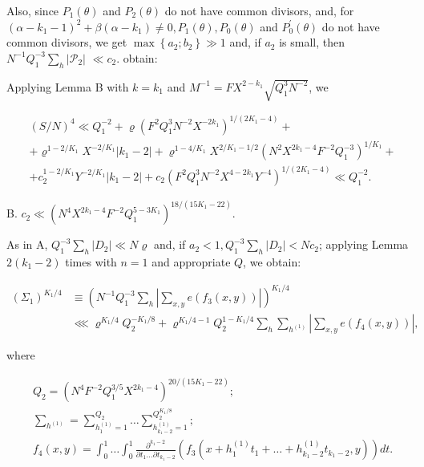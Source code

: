 \documentclass[10pt]{article}
\begin{document}
Also, since $P_{1}(\theta)$ and $P_{2}(\theta)$ do not have common divisors, and, for $\left(\alpha-k_{1}-1\right)^{2}+\beta\left(\alpha-k_{1}\right) \neq 0, P_{1}(\theta), P_{0}(\theta)$ and $P_{0}^{\prime}(\theta)$ do not have common divisors, we get $\max \left\{a_{2} ; b_{2}\right\} \gg 1$ and, if $a_{2}$ is small, then $N^{-1} Q_{1}^{-3} \sum_{h}\left|\mathscr{P}_{2}\right|$ $\ll c_{2}$. obtain:

Applying Lemma B with $k=k_{1}$ and $M^{-1}=F X^{2-k_{1}} \sqrt{Q_{1}^{3} N^{-2}}$, we

$$
\begin{aligned}
& (S / N)^{4} \ll Q_{1}^{-2}+\varrho\left(F^{2} Q_{1}^{3} N^{-2} X^{-2 k_{1}}\right)^{1 /\left(2 K_{1}-4\right)}+ \\
& +\varrho^{1-2 / K_{1}} X^{-2 / K_{1}}\left|k_{1}-2\right|+\varrho^{1-4 / K_{1}} X^{2 / K_{1}-1 / 2}\left(N^{2} X^{2 k_{1}-4} F^{-2} Q_{1}^{-3}\right)^{1 / K_{1}}+ \\
& +c_{2}^{1-2 / K_{1}} Y^{-2 / K_{1}}\left|k_{1}-2\right|+c_{2}\left(F^{2} Q_{1}^{3} N^{-2} X^{4-2 k_{1}} Y^{-4}\right)^{1 /\left(2 K_{1}-4\right)} \ll Q_{1}^{-2} .
\end{aligned}
$$

B. $c_{2} \ll\left(N^{4} X^{2 k_{1}-4} F^{-2} Q_{1}^{5-3 K_{1}}\right)^{18 /\left(15 K_{1}-22\right)}$.

As in A, $Q_{1}^{-3} \sum_{h}\left|D_{2}\right| \ll N \varrho$ and, if $a_{2}<1, Q_{1}^{-3} \sum_{h}\left|D_{2}\right|<N c_{2}$; applying Lemma $2\left(k_{1}-2\right)$ times with $n=1$ and appropriate $Q$, we obtain:

$$
\begin{aligned}
\left(\Sigma_{1}\right)^{K_{1} / 4} & \equiv\left(N^{-1} Q_{1}^{-3} \sum_{h}\left|\sum_{x, y} e\left(f_{3}(x, y)\right)\right|\right)^{K_{1} / 4} \\
& \lll \varrho^{K_{1} / 4} Q_{2}^{-K_{1} / 8}+\varrho^{K_{1} / 4-1} Q_{2}^{1-K_{1} / 4} \sum_{h} \sum_{h^{(1)}}\left|\sum_{x, y} e\left(f_{4}(x, y)\right)\right|,
\end{aligned}
$$

where

$$
\begin{aligned}
& Q_{2}=\left(N^{4} F^{-2} Q_{1}^{3 / 5} X^{2 k_{1}-4}\right)^{20 /\left(15 K_{1}-22\right)} ; \\
& \sum_{h^{(1)}}=\sum_{h_{1}^{(1)}=1}^{Q_{2}} \ldots \sum_{h_{k_{1}-2}^{(1)}=1}^{Q_{2}^{K_{1} / 8}} ; \\
& f_{4}(x, y)=\int_{0}^{1} \ldots \int_{0}^{1} \frac{\partial^{k_{1}-2}}{\partial t_{1} \ldots \partial t_{k_{1}-2}}\left(f_{3}\left(x+h_{1}^{(1)} t_{1}+\ldots+h_{k_{1}-2}^{(1)} t_{k_{1}-2}, y\right)\right) d t .
\end{aligned}
$$
\end{document}
